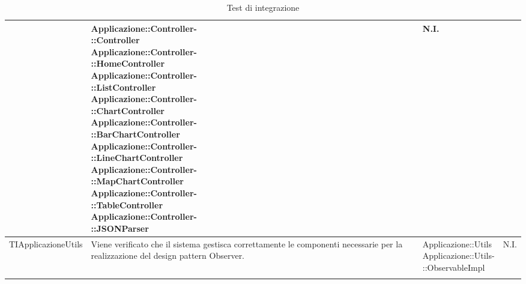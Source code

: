 \begin{longtabu}{| X | X | X[0.9] | X[0.3] |}
			& \parbox[t]{0.6\textwidth}{
			Applicazione::Controller-\\::Controller\\
			Applicazione::Controller-\\::HomeController\\
			Applicazione::Controller-\\::ListController\\
			Applicazione::Controller-\\::ChartController\\
			Applicazione::Controller-\\::BarChartController\\
			Applicazione::Controller-\\::LineChartController\\
			Applicazione::Controller-\\::MapChartController\\
			Applicazione::Controller-\\::TableController\\
			Applicazione::Controller-\\::JSONParser}
			& N.I.
\\ \hline
			TIApplicazioneUtils &
			Viene verificato che il sistema gestisca correttamente le componenti necessarie per la realizzazione del design pattern Observer.
			& \parbox[t]{0.6\textwidth}{
			Applicazione::Utils\\
			Applicazione::Utils-\\::ObservableImpl}
			& N.I. 
\\ \hline

\caption{Test di integrazione}

\end{longtabu}



